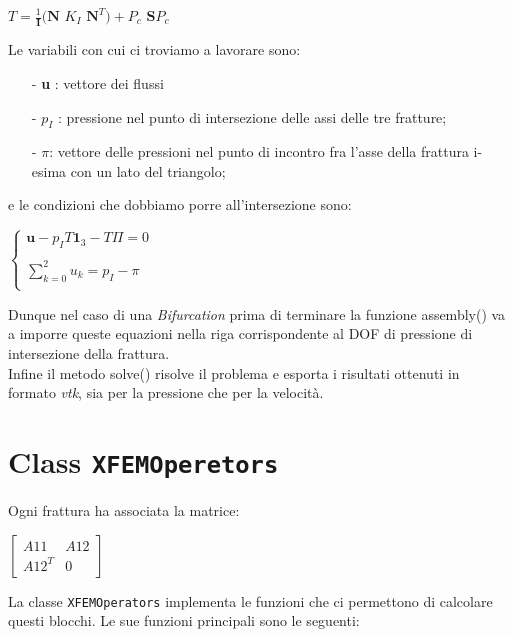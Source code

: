 \begin{center}
	$ T = \frac{1}{\textbf{I}}( \textbf{N}$ \textbf{$K_{I}$} $ \textbf{N}^{T} ) + $\textbf{$P_{c}$} $\textbf{S}$\textbf{$P_{c}$}
\end{center}
Le variabili con cui ci troviamo a lavorare sono:
	\begin{enumerate}
	\item[-] \textbf{u} : vettore dei flussi
	\item[-] $p_{I}$ :  pressione nel punto di intersezione delle assi delle tre fratture;
	\item[-] \textbf{$\pi$}: vettore delle pressioni nel punto di incontro fra l'asse della frattura i-esima con un lato del triangolo;
	\end{enumerate} 
e le condizioni che dobbiamo porre all'intersezione sono:
\begin{center}			
	$\left \{
		\begin{array}{l}	
	 		\textbf{u} - p_{I}T\textbf{1}_{3}-T\Pi=0  \\ \\
     	 	\sum_{k=0}^2 u_{k} = p_{I} - \pi  \\
		\end{array}
	\right.$
\end{center}
Dunque nel caso di una \textit{Bifurcation} prima di terminare la funzione assembly() va a imporre queste equazioni nella riga corrispondente al DOF di pressione di intersezione della frattura.\\
Infine il metodo solve() risolve il problema e esporta i risultati ottenuti in formato \emph{vtk}, sia per la pressione che per la velocit\`{a}.\\

\section{Class \texttt{XFEMOperetors}}
Ogni frattura ha associata la matrice:
\begin{center} 
 $ \left[ \begin{matrix}
 	A11 &  A12 \\ 
 	A12^{T} & 0
 \end{matrix}\right] $
\end{center} 

La classe \texttt{XFEMOperators} implementa le funzioni che ci permettono di calcolare questi blocchi.
Le sue funzioni principali sono le seguenti:

